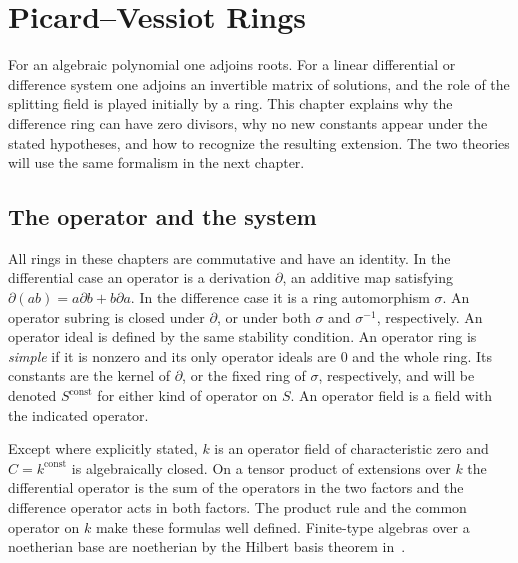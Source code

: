 \chapter{Picard--Vessiot Rings}

For an algebraic polynomial one adjoins roots. For a linear differential
or difference system one adjoins an invertible matrix of solutions,
and the role of the splitting field is played initially by a ring.
This chapter explains why the difference ring can have zero divisors,
why no new constants appear under the stated hypotheses, and how to
recognize the resulting extension. The two theories will use the same
formalism in the next chapter.

\section{The operator and the system}

\begin{definition}
\label{res:PV01}
All rings in these chapters are commutative and have an identity. In
the differential case an operator is a derivation \(\partial\), an
additive map satisfying \(\partial(ab)=a\partial b+b\partial a\).
In the difference case it is a ring automorphism \(\sigma\).
An operator subring is closed under \(\partial\), or under both
\(\sigma\) and \(\sigma^{-1}\), respectively. An operator ideal is
defined by the same stability condition. An operator ring is
\emph{simple} if it is nonzero and its only operator ideals are \(0\)
and the whole ring. Its constants are the kernel of \(\partial\), or
the fixed ring of \(\sigma\), respectively, and will be denoted
\(S^{\mathrm{const}}\) for either kind of operator on \(S\).
An operator field is a field with the indicated operator.
\end{definition}

Except where explicitly stated, \(k\) is an operator field of
characteristic zero and \(C=k^{\mathrm{const}}\) is algebraically
closed. On a tensor product of extensions over \(k\) the differential
operator is the sum of the operators in the two factors and the
difference operator acts in both factors. The product rule and the
common operator on \(k\) make these formulas well defined.
Finite-type algebras over a noetherian base are noetherian
by the Hilbert basis theorem in~\cite[Section 23.11, PDF p.~191]{mg-d07}.

